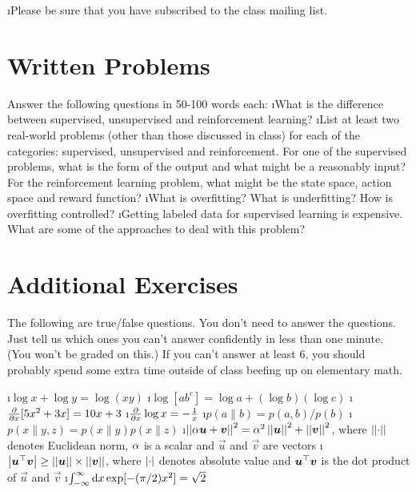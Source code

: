\documentclass[fleqn]{article}
\begin{document}

\i Please be sure that you have subscribed to the class mailing list.

\ene

\section{Written Problems}

Answer the following questions in 50-100 words each:
\bee
\i What is the difference between supervised, unsupervised and reinforcement learning?
\i List at least two real-world problems (other than those discussed in class) for each of the categories:
  supervised, unsupervised and reinforcement. For one of the supervised problems, what is the form
  of the output and what might be a reasonably input? For the reinforcement learning problem, what
  might be the state space, action space and reward function?
\i What is overfitting? What is underfitting? How is overfitting controlled?
\i Getting labeled data for supervised learning is expensive. What are some of the 
   approaches to deal with this problem?

\ene

\section{Additional Exercises}


The following are true/false questions.  You don't need to answer the
questions.  Just tell us which ones you can't answer confidently in
less than one minute.  (You won't be graded on this.)  If you can't
answer at least $6$, you should probably spend some extra time outside
of class beefing up on elementary math.  

\bee
\i $\log x + \log y = \log (xy)$
\i $\log [ab^c] = \log a + (\log b) (\log c)$
\i $\frac \partial {\partial x} [5x^2 + 3x] = 10x + 3$
\i $\frac \partial {\partial x} \log x = - \frac 1 x$
\i $p(a \| b) = p(a,b) / p(b)$
\i $p(x \| y,z) = p(x \| y) p(x \| z)$
\i $\left\vert\left\vert \alpha \boldsymbol{u} + \boldsymbol{v} \right\vert\right\vert^2 = \alpha^2 \left\vert\left\vert \boldsymbol{u} \right\vert\right\vert^2 + \left\vert\left\vert \boldsymbol{v} \right\vert\right\vert^2$, where $\left\vert\left\vert \cdot \right\vert\right\vert$ denotes Euclidean norm, $\alpha$ is a scalar and $\vec u$ and $\vec v$ are vectors
\i $\left\vert \boldsymbol{u}{}^\top\boldsymbol{v} \right\vert \geq \left\vert\left\vert \boldsymbol{u} \right\vert\right\vert \times \left\vert\left\vert \boldsymbol{v} \right\vert\right\vert$, where $\left\vert \cdot \right\vert$ denotes absolute value and $\boldsymbol{u}{}^\top\boldsymbol{v}$ is the dot product of $\vec u$ and $\vec v$
\i $\int_{-\infty}^{\infty} \textrm{d} x \exp[-(\pi/2) x^2] = \sqrt{2}$
\ene

\end{document}
